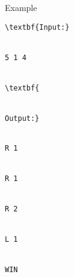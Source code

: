 Example
\begin{verbatim}
\textbf{Input:}


5 1 4


\textbf{


Output:}


R 1


R 1


R 2


L 1


WIN








\end{verbatim}